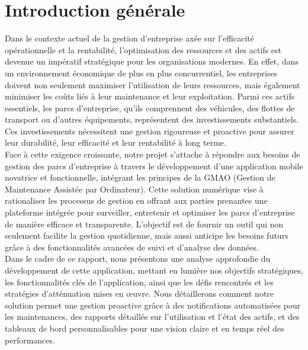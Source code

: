 \chapter*{Introduction générale}


Dans le contexte actuel de la gestion d’entreprise axée sur l’efficacité opérationnelle et la rentabilité, l’optimisation des ressources et des actifs est devenue un impératif stratégique pour les organisations modernes. En effet, dans un environnement économique de plus en plus concurrentiel, les entreprises doivent non seulement maximiser l’utilisation de leurs ressources, mais également minimiser les coûts liés à leur maintenance et leur exploitation. Parmi ces actifs essentiels, les parcs d’entreprise, qu’ils comprennent des véhicules, des flottes de transport ou d’autres équipements, représentent des investissements substantiels. Ces investissements nécessitent une gestion rigoureuse et proactive pour assurer leur durabilité, leur efficacité et leur rentabilité à long terme.\\

Face à cette exigence croissante, notre projet s’attache à répondre aux besoins de gestion des parcs d’entreprise à travers le développement d’une application mobile novatrice et fonctionnelle, intégrant les principes de la GMAO (Gestion de Maintenance Assistée par Ordinateur). Cette solution numérique vise à rationaliser les processus de gestion en offrant aux parties prenantes une plateforme intégrée pour surveiller, entretenir et optimiser les parcs d’entreprise de manière efficace et transparente. L’objectif est de fournir un outil qui non seulement facilite la gestion quotidienne, mais aussi anticipe les besoins futurs grâce à des fonctionnalités avancées de suivi et d’analyse des données.\\

Dans le cadre de ce rapport, nous présentons une analyse approfondie du développement de cette application, mettant en lumière nos objectifs stratégiques, les fonctionnalités clés de l’application, ainsi que les défis rencontrés et les stratégies d’atténuation mises en œuvre. Nous détaillerons comment notre solution permet une gestion proactive grâce à des notifications automatisées pour les maintenances, des rapports détaillés sur l’utilisation et l’état des actifs, et des tableaux de bord personnalisables pour une vision claire et en temps réel des performances.\\


